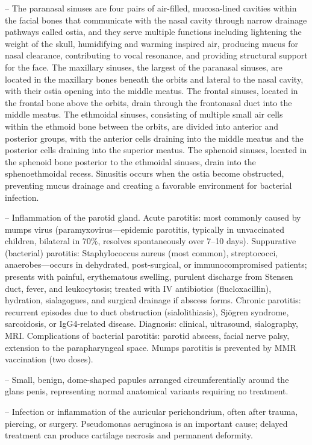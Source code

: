 -- The paranasal sinuses are four pairs of air-filled, mucosa-lined cavities within the facial bones that communicate with the nasal cavity through narrow drainage pathways called ostia, and they serve multiple functions including lightening the weight of the skull, humidifying and warming inspired air, producing mucus for nasal clearance, contributing to vocal resonance, and providing structural support for the face. The maxillary sinuses, the largest of the paranasal sinuses, are located in the maxillary bones beneath the orbits and lateral to the nasal cavity, with their ostia opening into the middle meatus. The frontal sinuses, located in the frontal bone above the orbits, drain through the frontonasal duct into the middle meatus. The ethmoidal sinuses, consisting of multiple small air cells within the ethmoid bone between the orbits, are divided into anterior and posterior groups, with the anterior cells draining into the middle meatus and the posterior cells draining into the superior meatus. The sphenoid sinuses, located in the sphenoid bone posterior to the ethmoidal sinuses, drain into the sphenoethmoidal recess. Sinusitis occurs when the ostia become obstructed, preventing mucus drainage and creating a favorable environment for bacterial infection.

-- Inflammation of the parotid gland. Acute parotitis: most commonly caused by mumps virus (paramyxovirus—epidemic parotitis, typically in unvaccinated children, bilateral in 70\%, resolves spontaneously over 7--10 days). Suppurative (bacterial) parotitis: Staphylococcus aureus (most common), streptococci, anaerobes—occurs in dehydrated, post-surgical, or immunocompromised patients; presents with painful, erythematous swelling, purulent discharge from Stensen duct, fever, and leukocytosis; treated with IV antibiotics (flucloxacillin), hydration, sialagogues, and surgical drainage if abscess forms. Chronic parotitis: recurrent episodes due to duct obstruction (sialolithiasis), Sjögren syndrome, sarcoidosis, or IgG4-related disease. Diagnosis: clinical, ultrasound, sialography, MRI. Complications of bacterial parotitis: parotid abscess, facial nerve palsy, extension to the parapharyngeal space. Mumps parotitis is prevented by MMR vaccination (two doses).

-- Small, benign, dome-shaped papules arranged circumferentially around the glans penis, representing normal anatomical variants requiring no treatment.

-- Infection or inflammation of the auricular perichondrium, often after trauma, piercing, or surgery. Pseudomonas aeruginosa is an important cause; delayed treatment can produce cartilage necrosis and permanent deformity.

